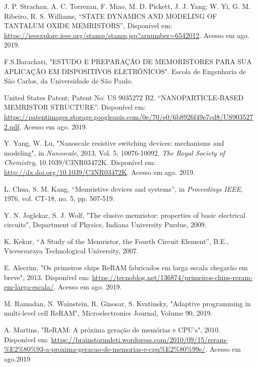 \documentclass{ceel}
\begin{document}
\begin{multicols}{2}
\begin{thebibliography}{9}
    J. P. Strachan, A. C. Torrezan, F. Miao, M. D. Pickett, J. J. Yang; W. Yi, G. M. Ribeiro, R. S. Williams, “STATE DYNAMICS AND MODELING OF TANTALUM OXIDE MEMRISTORS”, Disponível em: \url{https://ieeexplore.ieee.org/stamp/stamp.jsp?arnumber=6542012}. Acesso em ago. 2019.
 
   F.S.Barachati, "ESTUDO E PREPARAÇÃO DE MEMORISTORES PARA SUA APLICAÇÃO EM DISPOSITIVOS ELETRÔNICOS". Escola de Engenharia de São Carlos, da Universidade de São Paulo. 

    United States Patent; Patent No: US 9035272 B2. “NANOPARTICLE-BASED MEMRISTOR STRUCTURE”. Disponível em: \url{https://patentimages.storage.googleapis.com/0e/70/e0/6b8926f49e7cd8/US9035272.pdf}. Acesso em ago. 2019.
    

Y. Yang, W. Lu,
"Nanoscale resistive switching devices: mechanisms and modeling",
in \emph{Nanoscale},
2013, Vol. 5, 10076-10092, \emph{The Royal Society of Chemistry}, 10.1039/C3NR03472K. 
Disponível em: \url{http://dx.doi.org/10.1039/C3NR03472K}. Acesso em ago. 2019.

    L. Chua, S. M. Kang,
    “Memristive devices and systems”, 
    in \emph{Proceedings IEEE}, 1976, vol. CT-18, no. 5, pp. 507-519.

    Y. N. Joglekar, S. J. Wolf, "The elusive memristor: properties of basic electrical circuits", Department of Physics, Indiana University Purdue, 2009.

    K. Kekur,
    “A Study of the Memristor, the Fourth Circuit Element”, 
   B.E., Visvesvaraya Technological University, 2007.




   E. Alecrim, "Os primeiros chips ReRAM fabricados em larga escala chegarão em breve", 2013. Disponível em: \url{https://tecnoblog.net/136874/primeiros-chips-reram-em-larga-escala/}. Acesso em ago. 2019.
   
    M. Ramadan, N. Wainstein, R. Ginosar, S. Kvatinsky, "Adaptive programming in multi-level cell ReRAM", Microelectronics Journal, Volume 90, 2019. %
    
A. Martins, "ReRAM: A próxima geração de memórias e CPU's", 2010. Disponível em: \url{https://brainstormdeti.wordpress.com/2010/09/15/reram-\%E2\%80\%93-a-proxima-geracao-de-memorias-e-cpu\%E2\%80\%99s/}. Acesso em ago.2019



\end{thebibliography}


\end{multicols}
\end{document}
